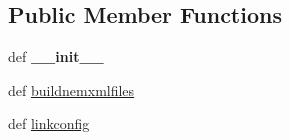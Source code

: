\subsection*{Public Member Functions}
\begin{DoxyCompactItemize}
\item 
\hypertarget{classcore_1_1emane_1_1commeffect_1_1_emane_comm_effect_model_a8ad129d1ffcf5b76a4f1164d35168ef1}{def {\bfseries \+\_\+\+\_\+init\+\_\+\+\_\+}}\label{classcore_1_1emane_1_1commeffect_1_1_emane_comm_effect_model_a8ad129d1ffcf5b76a4f1164d35168ef1}

\item 
def \hyperlink{classcore_1_1emane_1_1commeffect_1_1_emane_comm_effect_model_adaea2fc7e984b99de37f454a6af6914e}{buildnemxmlfiles}
\item 
def \hyperlink{classcore_1_1emane_1_1commeffect_1_1_emane_comm_effect_model_a39c8319a789281018c33bf8a5eeb9e11}{linkconfig}
\end{DoxyCompactItemize}


